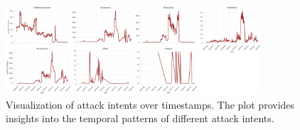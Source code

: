             \begin{figure}[H]
                \centering
                \includegraphics[width=0.85\textwidth]{../figures/plots/section1/intents_over_timestamps.png}
                \caption{Visualization of attack intents over timestamps. The plot provides insights into the temporal patterns of different attack intents.}
                \label{fig:intents_over_timestamps}
            \end{figure}
